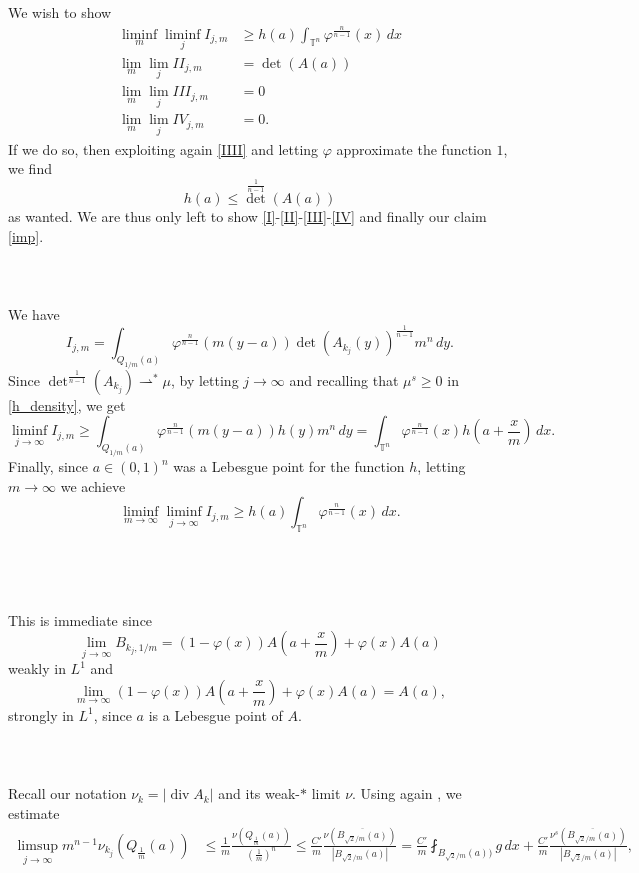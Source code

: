 \documentclass[10pt,reqno]{amsart}
\numberwithin{equation}{section}
\newcommand{\T}{\mathbb{T}}
\DeclareMathOperator{\dv}{div}
\theoremstyle{plain}
\theoremstyle{definition}
\theoremstyle{remark}
\begin{document}
We wish to show
\begin{align}
\liminf_m\liminf_j  I_{j,m} &\ge h(a)\int_{\T^n}\varphi^\frac{n}{n - 1}(x)\,dx \label{I}\\
\lim_m\lim_j  II_{j,m} &=\det\left(A(a)\right)\label{II}\\
\lim_m\lim_j  III_{j,m} &=0\label{III}\\
\lim_m\lim_j  IV_{j,m} &=0.\label{IV}
\end{align}
If we do so, then exploiting again \eqref{IIII} and letting $\varphi$ approximate the function $1$, we find
\[
h(a) \le {\det}^\frac{1}{n - 1}(A(a))
\]
as wanted. We are thus only left to show \eqref{I}-\eqref{II}-\eqref{III}-\eqref{IV} and finally our claim \eqref{imp}.
\\
\\
\indent{}
\\
\\
We have
$$
I_{j,m}=\int_{Q_{1/m}(a)} \varphi^{\frac{n}{n-1}}\left(m(y-a)\right)\det(A_{k_j}(y))^\frac{1}{n - 1}m^n\,dy.
$$
Since  $\det^{\frac{1}{n-1}}( A_{k_j})\rightharpoonup^* \mu$, by letting $j\to \infty$ and recalling that $\mu^s\geq 0$ in \eqref{h_density}, we get 
$$
\liminf_{j \to \infty} I_{j,m}\geq  \int_{Q_{1/m}(a)} \varphi^{\frac{n}{n-1}}\left(m(y-a)\right)h(y)m^n\,dy= \int_{\T^n} \varphi^{\frac{n}{n-1}}\left(x\right)h\left(a+\frac{x}{m}\right)\,dx.
$$
Finally, since  $a\in (0,1)^n$ was a Lebesgue point for the function $h$, letting $m \to \infty$ we achieve 
$$
\liminf_{m\to \infty} \liminf_{j\to \infty}I_{j,m} \geq  h(a) \int_{\T^n}  \varphi^{\frac{n}{n-1}}(x) \,dx.
$$
\\
\\
\indent{}
\\
\\
This is immediate since 
\[
\lim_{j\to \infty} B_{k_j,1/m} = (1-\varphi(x))A\left(a+\frac{x}{m}\right) + \varphi(x)A(a)
\] weakly in $L^1$ and 
\[
\lim_{m\to \infty}(1-\varphi(x))A\left(a+\frac{x}{m}\right) + \varphi(x)A(a) = A(a),
\]
strongly in $L^1$, since $a$ is a Lebesgue point of $A$.
\\
\\
\indent{}
\\
\\
Recall our notation $\nu_k = |\dv A_k|$ and its weak-$*$ limit $\nu$. Using again \cite[Thm. 1.40]{EVG}, we estimate
\begin{align*}
\limsup_{j \to \infty}m^{n-1}\nu_{k_j}(Q_{\frac1m}(a)) &\le \frac{1}{m}\frac{\nu(Q_{\frac1m}(a))}{(\frac1m)^n} \le \frac{C'}{m}\frac{\nu(\overline{B_{\sqrt{2}/m}(a)})}{|B_{\sqrt{2}/m}(a)|} = \frac{C'}{m}\fint_{B_{\sqrt{2}/m}(a))}g\,dx + \frac{C'}{m}\frac{\nu^s(\overline{B_{\sqrt{2}/m}(a)})}{|B_{\sqrt{2}/m}(a)|},
\end{align*}
\end{document}
